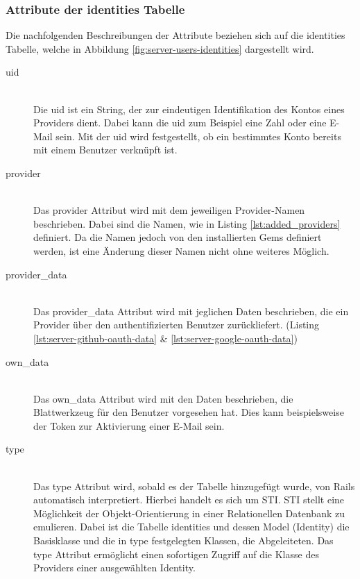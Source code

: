 \subsubsection*{Attribute der identities Tabelle}
Die nachfolgenden Beschreibungen der Attribute beziehen sich auf die identities Tabelle, welche in Abbildung \ref{fig:server-users-identities} dargestellt wird.
\begin{description}
	\item[uid]\hfill\\
	Die uid ist ein String, der zur eindeutigen Identifikation des Kontos eines Providers dient. Dabei kann die uid zum Beispiel eine Zahl oder eine E-Mail sein. Mit der uid wird festgestellt, ob ein bestimmtes Konto bereits mit einem Benutzer verknüpft ist.
	\item[provider]\hfill\\
	Das provider Attribut wird mit dem jeweiligen Provider-Namen beschrieben. Dabei sind die Namen, wie in Listing \ref{lst:added_providers} definiert. Da die Namen jedoch von den installierten Gems definiert werden, ist eine Änderung dieser Namen nicht ohne weiteres Möglich.
	\item[provider\_data]\hfill\\
	Das provider\_data Attribut wird mit jeglichen Daten beschrieben, die ein Provider über den authentifizierten Benutzer zurückliefert. (Listing \ref{lst:server-github-oauth-data} \& \ref{lst:server-google-oauth-data})

	\begin{minipage}{.42\textwidth}
		
	\end{minipage}\hfill
	\begin{minipage}{.42\textwidth}
		
	\end{minipage}

	\item[own\_data]\hfill\\
	Das own\_data Attribut wird mit den Daten beschrieben, die Blattwerkzeug für den Benutzer vorgesehen hat. Dies kann beispielsweise der Token zur Aktivierung einer E-Mail sein.
	\item[type]\hfill\\
	Das type Attribut wird, sobald es der Tabelle hinzugefügt wurde, von Rails automatisch interpretiert. Hierbei handelt es sich um \gls{STI}. \gls{STI} stellt eine Möglichkeit der Objekt-Orientierung in einer Relationellen Datenbank zu emulieren. Dabei ist die Tabelle identities und dessen Model (Identity) die Basisklasse und die in type festgelegten Klassen, die Abgeleiteten. Das type Attribut ermöglicht einen sofortigen Zugriff auf die Klasse des Providers einer ausgewählten Identity.
\end{description}

